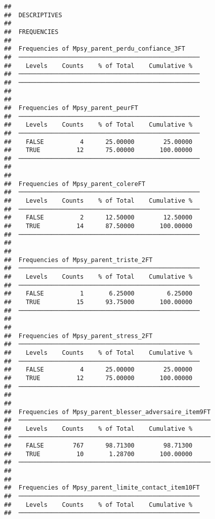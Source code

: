 \documentclass[
]{article}
\begin{document}
\begin{verbatim}
## 
##  DESCRIPTIVES
## 
##  FREQUENCIES
## 
##  Frequencies of Mpsy_parent_perdu_confiance_3FT     
##  ────────────────────────────────────────────────── 
##    Levels    Counts    % of Total    Cumulative %   
##  ────────────────────────────────────────────────── 
##  ────────────────────────────────────────────────── 
## 
## 
##  Frequencies of Mpsy_parent_peurFT                  
##  ────────────────────────────────────────────────── 
##    Levels    Counts    % of Total    Cumulative %   
##  ────────────────────────────────────────────────── 
##    FALSE          4      25.00000        25.00000   
##    TRUE          12      75.00000       100.00000   
##  ────────────────────────────────────────────────── 
## 
## 
##  Frequencies of Mpsy_parent_colereFT                
##  ────────────────────────────────────────────────── 
##    Levels    Counts    % of Total    Cumulative %   
##  ────────────────────────────────────────────────── 
##    FALSE          2      12.50000        12.50000   
##    TRUE          14      87.50000       100.00000   
##  ────────────────────────────────────────────────── 
## 
## 
##  Frequencies of Mpsy_parent_triste_2FT              
##  ────────────────────────────────────────────────── 
##    Levels    Counts    % of Total    Cumulative %   
##  ────────────────────────────────────────────────── 
##    FALSE          1       6.25000         6.25000   
##    TRUE          15      93.75000       100.00000   
##  ────────────────────────────────────────────────── 
## 
## 
##  Frequencies of Mpsy_parent_stress_2FT              
##  ────────────────────────────────────────────────── 
##    Levels    Counts    % of Total    Cumulative %   
##  ────────────────────────────────────────────────── 
##    FALSE          4      25.00000        25.00000   
##    TRUE          12      75.00000       100.00000   
##  ────────────────────────────────────────────────── 
## 
## 
##  Frequencies of Mpsy_parent_blesser_adversaire_item9FT 
##  ───────────────────────────────────────────────────── 
##    Levels    Counts    % of Total    Cumulative %   
##  ───────────────────────────────────────────────────── 
##    FALSE        767      98.71300        98.71300   
##    TRUE          10       1.28700       100.00000   
##  ───────────────────────────────────────────────────── 
## 
## 
##  Frequencies of Mpsy_parent_limite_contact_item10FT 
##  ────────────────────────────────────────────────── 
##    Levels    Counts    % of Total    Cumulative %   
##  ────────────────────────────────────────────────── 

\end{verbatim}
\end{document}
